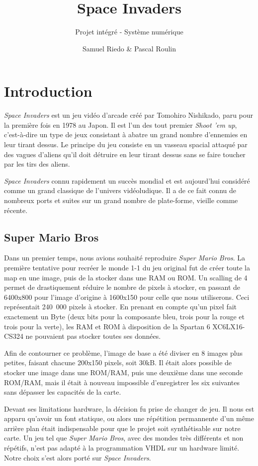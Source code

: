 \documentclass[french]{nakrule}
\author{Samuel Riedo \& Pascal Roulin}
\title{Space Invaders}
\subtitle{Projet intégré - Système numérique}
\begin{document}

\chapter{Introduction}
\label{introduction}

\emph{Space Invaders} est un jeu vidéo d'arcade créé par Tomohiro Nishikado, paru pour
la première fois en 1978 au Japon. Il est l'un des tout premier \emph{Shoot 'em
  up}, c'est-à-dire un type de jeux consistant à abatre un grand nombre d'ennemies en
leur tirant dessus. Le principe du jeu consiste en un vasseau spacial attaqué
par des vagues d'aliens qu'il doit détruire en leur tirant dessus sans se faire
toucher par les tirs des aliens.

\emph{Space Invaders} connu rapidement un succès mondial et est aujourd'hui
considéré comme un grand classique de l'univers vidéoludique. Il a de ce fait
connu de nombreux ports et suites sur un grand nombre de plate-forme, vieille
comme récente.

\section{Super Mario Bros}
\label{sec:mario}

Dans un premier temps, nous avions souhaité reproduire \emph{Super Mario Bros}.
La première tentative pour recréer le monde 1-1 du jeu original fut de créer
toute la map en une image, puis de la stocker dans une RAM ou ROM.
Un scalling de 4 permet de drastiquement réduire le nombre de pixels à stocker,
en passant de 6400x800 pour l'image d'origine à 1600x150 pour celle que nous
utiliserons.
Ceci représentait \si{240.000} pixels à stocker. En prenant en compte qu'un pixel
fait exactement un Byte (deux bits pour la composante bleu, trois pour la rouge
et trois pour la verte), les RAM et ROM à disposition de la Spartan 6
XC6LX16-CS324 ne pouvaient pas stocker toutes ses données.

Afin de contourner ce problème, l'image de base a été diviser en 8 images plus
petites, faisant chacune 200x150 pixels, soit 30kB. Il était alors possible de
stocker une image dans une ROM/RAM, puis une deuxième dans une seconde ROM/RAM,
mais il était à nouveau impossible d'enregistrer les six suivantes sans dépasser
les capacités de la carte.

Devant ses limitations hardware, la décision fu prise de changer de jeu. Il nous
est apparu qu'avoir un font statique, ou alors une répétition permannente d'un
même arrière plan était indispensable pour que le projet soit synthétisable sur
notre carte. Un jeu tel que \emph{Super Mario Bros}, avec des mondes très
différents et non répétifs, n'est pas adapté à la programmation VHDL sur un
hardware limité. Notre choix s'est alors porté sur \emph{Space Invaders}.
\end{document}

